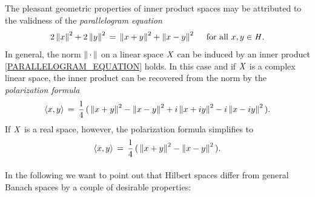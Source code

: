 \documentclass[11pt,twoside]{article}
\begin{document}
\subparagraph*{} %
The pleasant geometric properties of inner product spaces
may be attributed to the validness of the \textit{parallelogram equation}
\begin{equation}\label{PARALLELOGRAM_EQUATION}
2 \left\lVert x \right\rVert^2 + 2 \left\lVert y \right\rVert^2 \,=\, \left\lVert x+y \right\rVert^2 + \left\lVert x-y \right\rVert^2
\quad \mbox{ for all } x,y \in \mathit{H}.
\end{equation}
In general,
the norm $\left\lVert \,\cdot\, \right\rVert$ on a linear space $\mathit{X}$
can be induced by an inner product
\iff \eqref{PARALLELOGRAM_EQUATION} holds.
In this case and if $\mathit{X}$ is a complex linear space,
the inner product can be recovered from the norm
by the \textit{polarization formula}
\[
\langle x,y \rangle
\,=\,
\frac{1}{4} \,
(\,
\left\lVert x + y \right\rVert^2 - \left\lVert x-y \right\rVert^2 +i \left\lVert x+iy \right\rVert^2 - i \left\lVert x-iy \right\rVert^2
\,).
\]
If $\mathit{X}$ is a real space,
however,
the polarization formula simplifies to
\[
\langle x,y \rangle \,=\,
\frac{1}{4} \,
(\,
\left\lVert x + y \right\rVert^2 - \left\lVert x-y \right\rVert^2
\,).
\]

\paragraph*{} %
In the following we want to point out
that Hilbert spaces differ from general Banach spaces
by a couple of desirable properties:
\end{document}
